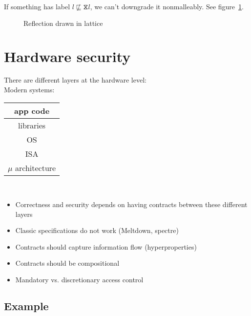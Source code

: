 \documentclass{article}
\newcommand{\refl}{\hourglass}
\begin{document}
If something has label $l \not\sqsubseteq \refl l$, we can't downgrade it nonmalleably. See figure~\ref{fig4}.


\begin{figure}[ht!]
\label{fig4}
\caption{Reflection drawn in lattice}
\end{figure}

\section{Hardware security}

There are different layers at the hardware level: \\

Modern systems:
\begin{tabular}{|c|}
\hline
app code \\
\hline
libraries \\ 
\hline
OS \\
\hline
ISA \\ 
\hline
$\mu$ architecture \\
\hline
\end{tabular} \\

\begin{itemize}
	\item{Correctness and security depends on having contracts between these different layers}
	\item{Classic specifications do not work (Meltdown, spectre)}
	\item{Contracts should capture information flow (hyperproperties)}
	\item{Contracts should be compositional}
	\item{Mandatory vs. discretionary access control}
\end{itemize}

\subsection{Example}

\pagebreak
\end{document}
